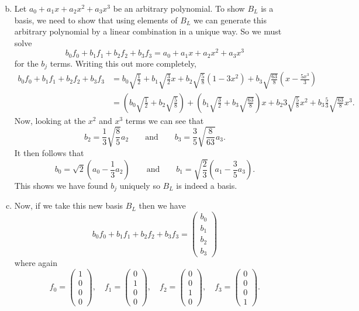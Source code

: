 \documentclass[12pt]{article} %
\begin{document}
\begin{solution}
\begin{enumerate}[(a)]
\[\]
\item Let $a_0 + a_1 x + a_2x^2 + a_3x^3$ be an arbitrary polynomial. To show $B_L$ is a basis, we need to show that using elements of $B_L$ we can generate this arbitrary polynomial by a linear combination in a unique way. So we must solve
\[
b_0 f_0 + b_1 f_1 + b_2 f_2 + b_3 f_3 = a_0 + a_1 x + a_2x^2 + a_3x^3
\]
for the $b_j$ terms. Writing this out more completely,
\begin{align*}
b_0 f_0 + b_1 f_1 + b_2 f_2 + b_3 f_3 &= b_0 \sqrt{\frac{1}{2}}+ b_1 \sqrt{\frac{3}{2}}x + b_2 \sqrt{\frac{5}{8}} (1-3x^2) + b_3 \sqrt{\frac{63}{8}}\left(x-\frac{5x^3}{3}\right)\\
&= \left(b_0 \sqrt{\frac{1}{2}} + b_2 \sqrt{\frac{5}{8}}\right) + \left(b_1 \sqrt{\frac{3}{2}} + b_3 \sqrt{\frac{63}{8}}\right)x +  b_2 3\sqrt{\frac{5}{8}} x^2 + b_3 \frac{5}{3}\sqrt{\frac{63}{8}} x^3.
\end{align*}
Now, looking at the $x^2$ and $x^3$ terms we can see that
\[
b_2 = \frac{1}{3}\sqrt{\frac{8}{5}} a_2 \qquad \textrm{and} \qquad b_3 = \frac{3}{5} \sqrt{\frac{8}{63}}a_3.
\]
It then follows that
\[
b_0 = \sqrt{2}\left(a_0  -\frac{1}{3}a_2\right) \qquad \textrm{and} \qquad b_1 = \sqrt{\frac{2}{3}} \left( a_1 - \frac{3}{5}a_3 \right).
\]
This shows we have found $b_j$ uniquely so $B_L$ is indeed a basis.
\item Now, if we take this new basis $B_L$ then we have
\[
b_0 f_0 + b_1 f_1 + b_2 f_2 + b_3 f_3 = \begin{pmatrix} b_0 \\ b_1 \\ b_2 \\ b_3 \end{pmatrix}
\]
where again
\[
f_0 = \begin{pmatrix} 1 \\ 0 \\ 0 \\ 0 \end{pmatrix},\quad f_1 = \begin{pmatrix} 0 \\ 1 \\ 0 \\ 0 \end{pmatrix},\quad f_2 = \begin{pmatrix} 0 \\ 0 \\ 1 \\ 0 \end{pmatrix},\quad f_3 = \begin{pmatrix} 0 \\ 0 \\ 0 \\ 1 \end{pmatrix}.
\]
\end{enumerate}
\end{solution}
\end{document}
